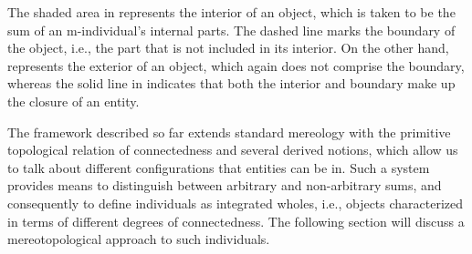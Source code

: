 \iffalse

\begin{figure}[h!]
\RawFloats
\centering
\begin{minipage}[b]{.49\textwidth}
\centering
\begin{tikzpicture}
  \draw (0,0) -- (0,3) -- (3,3) -- (3,0) -- (0,0);
  \draw[dashed,pattern=south east lines,pattern color=gray!25] (1.5,1.5) circle (1cm);
  \node at (1.5,1.5) {$a$};
\end{tikzpicture}
\caption{Interior}
\label{fig:interior}
\end{minipage}
\begin{minipage}[b]{.49\textwidth}
\centering
\begin{tikzpicture}
  \draw[pattern=south east lines,pattern color=gray!25] (0,0) -- (0,3) -- (3,3) -- (3,0) -- (0,0);
  \draw[dashed,fill=white] (1.5,1.5) circle (1cm);
  \node at (1.5,1.5) {$a$};
\end{tikzpicture}
\caption{Exterior}
\label{fig:exterior}
\end{minipage}
~
\begin{minipage}[b]{1.0\textwidth}
\vspace{1.0ex}
\centering
\begin{tikzpicture}
  \draw (0,0) -- (0,3) -- (3,3) -- (3,0) -- (0,0);
  \draw[pattern=south east lines,pattern color=gray!25] (1.5,1.5) circle (1cm);
  \node at (1.5,1.5) {$a$};
\end{tikzpicture}
\caption{Closure}
\label{fig:closure}
\end{minipage}
\end{figure}

\fi

The shaded area in  represents the interior of an object, which is taken to be the sum of an m-individual's internal parts. The dashed line marks the boundary of the object, i.e., the part that is not included in its interior. On the other hand,  represents the exterior of an object, which again does not comprise the boundary, whereas the solid line in  indicates that both the interior and boundary make up the closure of an entity.

The framework described so far extends standard mereology with the primitive topological relation of connectedness and several derived notions, which allow us to talk about different configurations that entities can be in. Such a system provides means to distinguish between arbitrary and non-arbitrary sums, and consequently to define individuals as integrated wholes, i.e., objects characterized in terms of different degrees of connectedness. The following section will discuss a mereotopological approach to such individuals.

